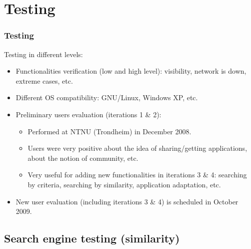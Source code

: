 \section{Testing}

\begin{frame}

	\frametitle{Testing} 
	
	Testing in different levels:
	
	\begin{itemize}

        \item Functionalities verification (low and high level): visibility,
        network is down, extreme cases, etc.
        \item Different OS compatibility: GNU/Linux, Windows XP, etc.
        \item Preliminary users evaluation (iterations 1 \& 2):
        \begin{itemize}
          \item Performed at NTNU (Trondheim) in December 2008.
          \item Users were very positive about the idea of sharing/getting
          applications, about the notion of community, etc.
          \item Very useful for adding new functionalities in iterations 3 \& 4:
          searching by criteria, searching by similarity, application
          adaptation, etc.
        \end{itemize}
        \item New user evaluation (including iterations 3 \& 4) is scheduled in
        October 2009.

	\end{itemize}

\end{frame}

\subsection{Search engine testing (similarity)}

